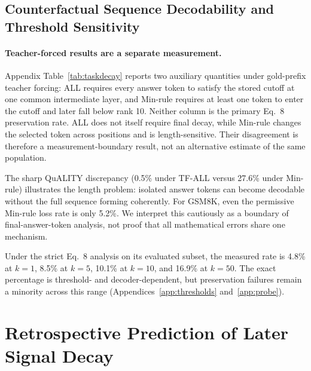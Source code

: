 \documentclass{article} %
\begin{document}
\subsection{Counterfactual Sequence Decodability and Threshold Sensitivity}
\label{sec:taskdecay}

\paragraph{Teacher-forced results are a separate measurement.}
Appendix Table~\ref{tab:taskdecay} reports two auxiliary quantities under gold-prefix teacher forcing: ALL requires every answer token to satisfy the stored cutoff at one common intermediate layer, and Min-rule requires at least one token to enter the cutoff and later fall below rank 10. Neither column is the primary Eq.~8 preservation rate. ALL does not itself require final decay, while Min-rule changes the selected token across positions and is length-sensitive. Their disagreement is therefore a measurement-boundary result, not an alternative estimate of the same population.

The sharp QuALITY discrepancy (0.5\% under TF-ALL versus 27.6\% under Min-rule) illustrates the length problem: isolated answer tokens can become decodable without the full sequence forming coherently. For GSM8K, even the permissive Min-rule loss rate is only 5.2\%. We interpret this cautiously as a boundary of final-answer-token analysis, not proof that all mathematical errors share one mechanism.

Under the strict Eq.~8 analysis on its evaluated subset, the measured rate is 4.8\% at $k=1$, 8.5\% at $k=5$, 10.1\% at $k=10$, and 16.9\% at $k=50$. The exact percentage is threshold- and decoder-dependent, but preservation failures remain a minority across this range (Appendices~\ref{app:thresholds} and~\ref{app:probe}).

\section{Retrospective Prediction of Later Signal Decay}
\end{document}
